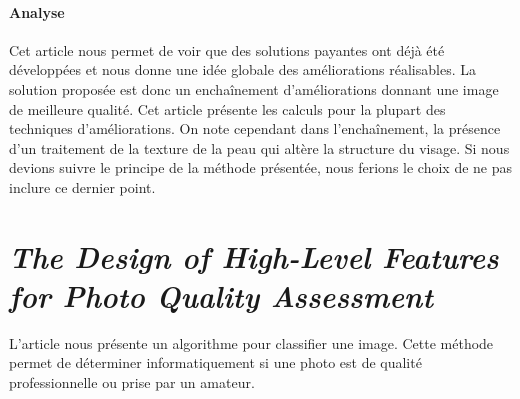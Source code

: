 \documentclass[11pt, french,screen]{report-rd-info}
\begin{document}
\paragraph{Analyse}
Cet article nous permet de voir que des solutions payantes ont déjà été développées et nous donne une idée globale des améliorations réalisables. La solution proposée est donc un enchaînement d’améliorations donnant une image de meilleure qualité.
Cet article présente les calculs pour la plupart des techniques d’améliorations. On note cependant dans l'enchaînement, la présence d’un traitement de la texture de la peau qui altère la structure du visage. Si nous devions suivre le principe de la méthode présentée, nous ferions le choix de ne pas inclure ce dernier point.
\section{\emph{The Design of High-Level Features for Photo Quality Assessment}}
L'article \cite{Ke} nous présente un algorithme pour classifier une image. Cette méthode permet de déterminer informatiquement si une photo est de qualité professionnelle ou prise par un amateur.
\end{document}
